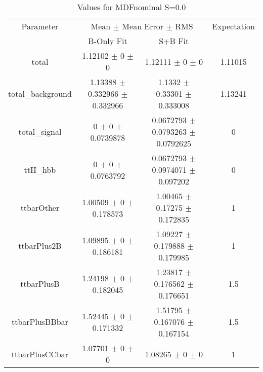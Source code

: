 \begin{table}
\centering
\caption{Values for MDFnominal S=0.0}
\begin{tabular}{cccc}
\toprule
Parameter & \multicolumn{2}{c}{Mean $\pm$ Mean Error $\pm$ RMS} & Expectation\\
 & B-Only Fit & S+B Fit & \\
\midrule
total & \num{1.12102} $\pm$ \num{0} $\pm$ \num{0} & \num{1.12111} $\pm$ \num{0} $\pm$ \num{0} & \num{1.11015}\\
total\_background & \num{1.13388} $\pm$ \num{0.332966} $\pm$ \num{0.332966} & \num{1.1332} $\pm$ \num{0.33301} $\pm$ \num{0.333008} & \num{1.13241}\\
total\_signal & \num{0} $\pm$ \num{0} $\pm$ \num{0.0739878} & \num{0.0672793} $\pm$ \num{0.0793263} $\pm$ \num{0.0792625} & \num{0}\\
ttH\_hbb & \num{0} $\pm$ \num{0} $\pm$ \num{0.0763792} & \num{0.0672793} $\pm$ \num{0.0974071} $\pm$ \num{0.097202} & \num{0}\\
ttbarOther & \num{1.00509} $\pm$ \num{0} $\pm$ \num{0.178573} & \num{1.00465} $\pm$ \num{0.17275} $\pm$ \num{0.172835} & \num{1}\\
ttbarPlus2B & \num{1.09895} $\pm$ \num{0} $\pm$ \num{0.186181} & \num{1.09227} $\pm$ \num{0.179888} $\pm$ \num{0.179985} & \num{1}\\
ttbarPlusB & \num{1.24198} $\pm$ \num{0} $\pm$ \num{0.182045} & \num{1.23817} $\pm$ \num{0.176562} $\pm$ \num{0.176651} & \num{1.5}\\
ttbarPlusBBbar & \num{1.52445} $\pm$ \num{0} $\pm$ \num{0.171332} & \num{1.51795} $\pm$ \num{0.167076} $\pm$ \num{0.167154} & \num{1.5}\\
ttbarPlusCCbar & \num{1.07701} $\pm$ \num{0} $\pm$ \num{0} & \num{1.08265} $\pm$ \num{0} $\pm$ \num{0} & \num{1}\\
\bottomrule
\end{tabular}
\end{table}